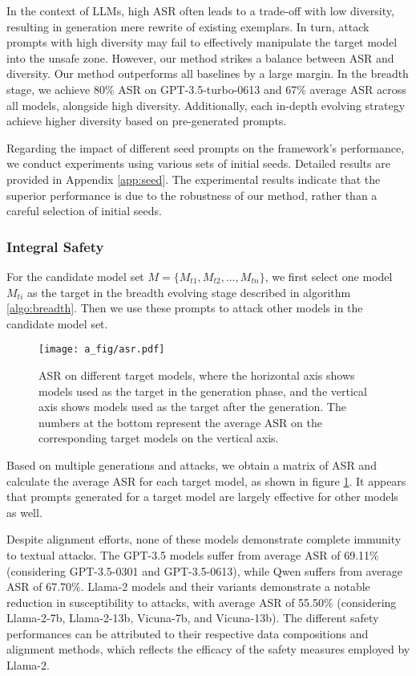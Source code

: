 In the context of LLMs, high ASR often leads to a trade-off with low diversity, resulting in generation mere rewrite of existing exemplars. In turn, attack prompts with high diversity may fail to effectively manipulate the target model into the unsafe zone. However, our \modelname method strikes a balance between ASR and diversity. Our method outperforms all baselines by a large margin. In the breadth stage, we achieve 80\% ASR on GPT-3.5-turbo-0613 and 67\% average ASR across all models, alongside high diversity. Additionally, each in-depth evolving strategy achieve higher diversity based on pre-generated prompts.

Regarding the impact of different seed prompts on the framework's performance, we conduct experiments using various sets of initial seeds. Detailed results are provided in Appendix \ref{app:seed}. The experimental results indicate that the superior performance is due to the robustness of our method, rather than a careful selection of initial seeds. 



\subsubsection{Integral Safety}
 For the candidate model set $M=\{M_{t1}, M_{t2}, \ldots, M_{tn}\}$, we first select one model $M_{ti}$ as the target in the breadth evolving stage described in algorithm \ref{algo:breadth}. Then we use these prompts to attack other models in the candidate model set. 

\begin{figure}[!t]
  \centering
  \texttt{[image: a\_fig/asr.pdf]}
  \caption{ASR on different target models, where the horizontal axis shows models used as the target in the generation phase, and the vertical axis shows models used as the target after the generation. The numbers at the bottom represent the average ASR on the corresponding target models on the vertical axis.}
  \label{fig:asr}
\end{figure}

Based on multiple generations and attacks, we obtain a matrix of ASR and calculate the average ASR for each target model, as shown in figure \ref{fig:asr}. It appears that prompts generated for a target model are largely effective for other models as well. 

Despite alignment efforts, none of these models demonstrate complete immunity to textual attacks. The GPT-3.5 models suffer from average ASR of 69.11\% (considering GPT-3.5-0301 and GPT-3.5-0613), while Qwen suffers from average ASR of 67.70\%. Llama-2 models and their variants demonstrate a notable reduction in susceptibility to attacks, with average ASR of 55.50\% (considering Llama-2-7b, Llama-2-13b, Vicuna-7b, and Vicuna-13b). The different safety performances can be attributed to their respective data compositions and alignment methods, which reflects the efficacy of the safety measures employed by Llama-2. 

